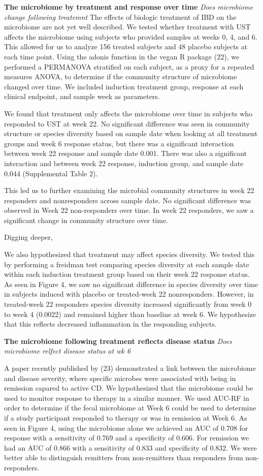 \documentclass[11pt,]{article}
\begin{document}
\textbf{The microbiome by treatment and response over time} \emph{Does
microbiome change following treatemnt} The effects of biologic treatment
of IBD on the microbiome are not yet well described. We tested whether
treatment with UST affects the microbiome using subjects who provided
samples at weeks 0, 4, and 6. This allowed for us to analyze 156 treated
subjects and 48 placebo subjects at each time point. Using the adonis
function in the vegan R package (22), we performed a PERMANOVA
stratified on each subject, as a proxy for a repeated measures ANOVA, to
determine if the community structure of microbiome changed over time. We
included induction treatment group, response at each clinical endpoint,
and sample week as parameters.

We found that treatment only affects the microbiome over time in
subjects who responded to UST at week 22. No significant difference was
seen in community structure or species diversity based on sample date
when looking at all treatment groups and week 6 response status, but
there was a significant interaction between week 22 response and sample
date 0.001. There was also a significant interaction and between week 22
response, induction group, and sample date 0.044 (Supplemental Table 2).

This led us to further examining the microbial community structures in
week 22 responders and nonresponders across sample date. No significant
difference was observed in Week 22 non-responders over time. In week 22
responders, we saw a significant change in community structure over
time.

Digging deeper,

We also hypothesized that treatment may affect species diversity. We
tested this by performing a freidman test comparing species diversity at
each sample date within each induction treatment group based on their
week 22 response status. As seen in Figure 4, we saw no significant
difference in species diversity over time in subjects induced with
placebo or treated-week 22 nonresponders. However, in treated-week 22
responders species diversity increased significantly from week 0 to week
4 (0.0022) and remained higher than baseline at week 6. We hypothesize
that this reflects decreased inflammation in the responding subjects.

\textbf{The microbiome following treatment reflects disease status}
\emph{Does microbiome relfect disease status at wk 6}

A paper recently published by (23) demonstrated a link between the
microbiome and disease severity, where specific microbes were associated
with being in remission capared to active CD. We hypothesized that the
microbiome could be used to monitor response to therapy in a similar
manner. We used AUC-RF in order to determine if the fecal microbiome at
Week 6 could be used to determine if a study participant responded to
therapy or was in remission at Week 6. As seen in Figure 4, using the
microbiome alone we achieved an AUC of 0.708 for response with a
sensitivity of 0.769 and a specificity of 0.606. For remission we had an
AUC of 0.866 with a sensitivity of 0.833 and specificity of 0.832. We
were better able to distinguish remitters from non-remitters than
responders from non-responders.
\end{document}

